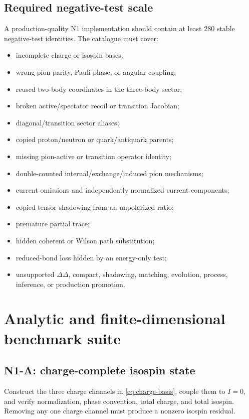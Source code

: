 \documentclass[11pt]{article}
\begin{document}
\subsection{Required negative-test scale}

A production-quality N1 implementation should contain at least 280 stable
negative-test identities.  The catalogue must cover:
\begin{itemize}
\item incomplete charge or isospin bases;
\item wrong pion parity, Pauli phase, or angular coupling;
\item reused two-body coordinates in the three-body sector;
\item broken active/spectator recoil or transition Jacobian;
\item diagonal/transition sector aliases;
\item copied proton/neutron or quark/antiquark parents;
\item missing pion-active or transition operator identity;
\item double-counted internal/exchange/induced pion mechanisms;
\item current omissions and independently normalized current components;
\item copied tensor shadowing from an unpolarized ratio;
\item premature partial trace;
\item hidden coherent or Wilson path substitution;
\item reduced-bond loss hidden by an energy-only test;
\item unsupported \(\Delta\Delta\), compact, shadowing, matching, evolution,
process, inference, or production promotion.
\end{itemize}

\section{Analytic and finite-dimensional benchmark suite}
\label{sec:benchmarks}

\subsection{N1-A: charge-complete isospin state}

Construct the three charge channels in \cref{eq:charge-basis}, couple them to
\(I=0\), and verify normalization, phase convention, total charge, and total
isospin.  Removing any one charge channel must produce a nonzero isospin
residual.
\end{document}
